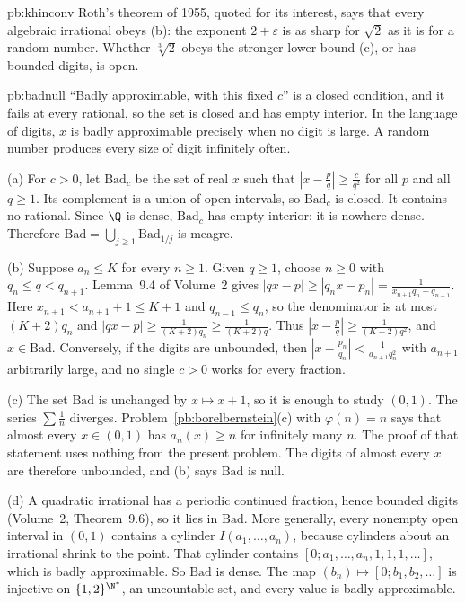 \begin{solution}{pb:khinconv}
\leads Roth's theorem of 1955, quoted for its interest, says that every algebraic irrational obeys (b): the exponent $2+\varepsilon$ is as sharp for $\sqrt2$ as it is for a random number. Whether $\sqrt[3]{2}$ obeys the stronger lower bound (c), or has bounded digits, is open.
\end{solution}

\begin{solution}{pb:badnull}
\idea ``Badly approximable, with this fixed $c$'' is a closed condition, and it fails at every rational, so the set is closed and has empty interior. In the language of digits, $x$ is badly approximable precisely when no digit is large. A random number produces every size of digit infinitely often.

\writeup (a) For $c>0$, let $\mathrm{Bad}_c$ be the set of real $x$ such that $|x-\frac pq|\ge\frac c{q^2}$ for all $p$ and all $q\ge 1$. Its complement is a union of open intervals, so $\mathrm{Bad}_c$ is closed. It contains no rational. Since $\Q$ is dense, $\mathrm{Bad}_c$ has empty interior: it is nowhere dense. Therefore $\mathrm{Bad}=\bigcup_{j\ge 1}\mathrm{Bad}_{1/j}$ is meagre.

(b) Suppose $a_n\le K$ for every $n\ge 1$. Given $q\ge 1$, choose $n\ge 0$ with $q_n\le q<q_{n+1}$. Lemma~9.4 of Volume~2 gives $|qx-p|\ge|q_nx-p_n|=\frac1{x_{n+1}q_n+q_{n-1}}$. Here $x_{n+1}<a_{n+1}+1\le K+1$ and $q_{n-1}\le q_n$, so the denominator is at most $(K+2)q_n$ and $|qx-p|\ge\frac1{(K+2)q_n}\ge\frac1{(K+2)q}$. Thus $|x-\frac pq|\ge\frac1{(K+2)q^2}$, and $x\in\mathrm{Bad}$. Conversely, if the digits are unbounded, then $|x-\frac{p_n}{q_n}|<\frac1{a_{n+1}q_n^2}$ with $a_{n+1}$ arbitrarily large, and no single $c>0$ works for every fraction.

(c) The set $\mathrm{Bad}$ is unchanged by $x\mapsto x+1$, so it is enough to study $(0,1)$. The series $\sum\frac1n$ diverges. Problem~\ref{pb:borelbernstein}(c) with $\varphi(n)=n$ says that almost every $x\in(0,1)$ has $a_n(x)\ge n$ for infinitely many $n$. The proof of that statement uses nothing from the present problem. The digits of almost every $x$ are therefore unbounded, and (b) says $\mathrm{Bad}$ is null.

(d) A quadratic irrational has a periodic continued fraction, hence bounded digits (Volume~2, Theorem~9.6), so it lies in $\mathrm{Bad}$. More generally, every nonempty open interval in $(0,1)$ contains a cylinder $I(a_1,\dots,a_n)$, because cylinders about an irrational shrink to the point. That cylinder contains $[0;a_1,\dots,a_n,1,1,1,\dots]$, which is badly approximable. So $\mathrm{Bad}$ is dense. The map $(b_n)\mapsto[0;b_1,b_2,\dots]$ is injective on $\{1,2\}^{\N^*}$, an uncountable set, and every value is badly approximable.


\end{solution}
